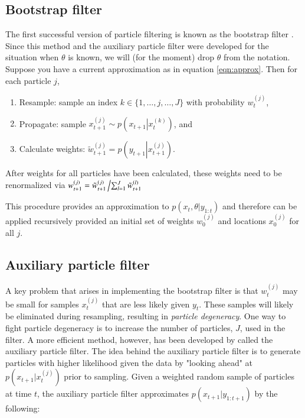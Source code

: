\documentclass{elsarticle}
\begin{document}
\subsection{Bootstrap filter}

The first successful version of particle filtering is known as the bootstrap filter \citep{Gord:Salm:Smit:nove:1993}. Since this method and the auxiliary particle filter were developed for the situation when $\theta$ is known, we will (for the moment) drop $\theta$ from the notation. Suppose you have a current approximation as in equation \eqref{eqn:approx}. Then for each particle $j$,

\begin{enumerate}
\item Resample: sample an index $k\in \{1,\ldots,j,\ldots,J\}$ with probability $w_t^{(j)}$,
\item Propagate: sample $x_{t+1}^{(j)} \sim p\left(\left. x_{t+1}\right|x_t^{(k)}\right)$, and
\item Calculate weights: $\tilde{w}_{t+1}^{(j)} = p\left(y_{t+1}\left|x_{t+1}^{(j)}\right.\right)$.
\end{enumerate}

\noindent After weights for all particles have been calculated, these weights need to be renormalized via $w_{t+1}^{(j)} = \tilde{w}_{t+1}^{(j)}\left/ \sum_{l=1}^J \tilde{w}_{t+1}^{(l)} \right.$

This procedure provides an approximation to $p(x_t,\theta| y_{1:t})$ and therefore can be applied recursively provided an initial set of weights $w_0^{(j)}$ and locations $x_0^{(j)}$ for all $j$.

\subsection{Auxiliary particle filter}

A key problem that arises in implementing the bootstrap filter is that $w_t^{(j)}$ may be small for samples $x_t^{(j)}$ that are less likely given $y_t$. These samples will likely be eliminated during resampling, resulting in \emph{particle degeneracy}. One way to fight particle degeneracy is to increase the number of particles, $J$, used in the filter. A more efficient method, however, has been developed by \citet{Pitt:Shep:filt:1999} called the auxiliary particle filter.  The idea behind the auxiliary particle filter is to generate particles with higher likelihood given the data by "looking ahead" at $p(x_{t+1}|x_t^{(j)})$ prior to sampling. Given a weighted random sample of particles at time $t$, the auxiliary particle filter approximates $p(x_{t+1}|y_{1:t+1})$ by the following:
\end{document}
